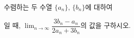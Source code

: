 수렴하는 두 수열 $\{a_n\}$, $\{b_n\}$에 대하여 \par\smallskip{}\par\smallskip\noindent 일 때, $\displaystyle\lim_{n\to\infty}\dfrac{3b_n-a_n}{2a_n+3b_n}$의 값을 구하시오.
